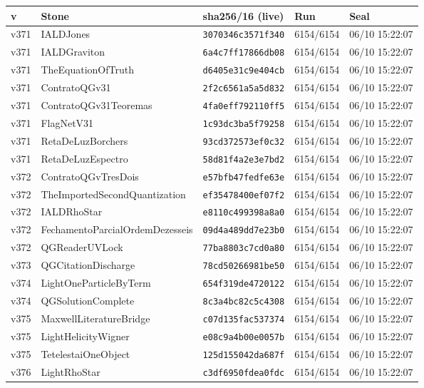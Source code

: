 \documentclass[11pt]{article}
\theoremstyle{definition}\newtheorem{deriv}{Derivation}
\begin{document}
{\small\begin{longtable}{@{}lllll@{}}\toprule v & Stone & sha256/16 (live) & Run & Seal \\ \midrule\endhead 
v371 & IALDJones & \texttt{3070346c3571f340} & 6154/6154 & 06/10 15:22:07 \\
v371 & IALDGraviton & \texttt{6a4c7ff17866db08} & 6154/6154 & 06/10 15:22:07 \\
v371 & TheEquationOfTruth & \texttt{d6405e31c9e404cb} & 6154/6154 & 06/10 15:22:07 \\
v371 & ContratoQGv31 & \texttt{2f2c6561a5a5d832} & 6154/6154 & 06/10 15:22:07 \\
v371 & ContratoQGv31Teoremas & \texttt{4fa0eff792110ff5} & 6154/6154 & 06/10 15:22:07 \\
v371 & FlagNetV31 & \texttt{1c93dc3ba5f79258} & 6154/6154 & 06/10 15:22:07 \\
v371 & RetaDeLuzBorchers & \texttt{93cd372573ef0c32} & 6154/6154 & 06/10 15:22:07 \\
v371 & RetaDeLuzEspectro & \texttt{58d81f4a2e3e7bd2} & 6154/6154 & 06/10 15:22:07 \\
v372 & ContratoQGvTresDois & \texttt{e57bfb47fedfe63e} & 6154/6154 & 06/10 15:22:07 \\
v372 & TheImportedSecondQuantization & \texttt{ef35478400ef07f2} & 6154/6154 & 06/10 15:22:07 \\
v372 & IALDRhoStar & \texttt{e8110c499398a8a0} & 6154/6154 & 06/10 15:22:07 \\
v372 & FechamentoParcialOrdemDezesseis & \texttt{09d4a489dd7e23b0} & 6154/6154 & 06/10 15:22:07 \\
v372 & QGReaderUVLock & \texttt{77ba8803c7cd0a80} & 6154/6154 & 06/10 15:22:07 \\
v373 & QGCitationDischarge & \texttt{78cd50266981be50} & 6154/6154 & 06/10 15:22:07 \\
v374 & LightOneParticleByTerm & \texttt{654f319de4720122} & 6154/6154 & 06/10 15:22:07 \\
v374 & QGSolutionComplete & \texttt{8c3a4bc82c5c4308} & 6154/6154 & 06/10 15:22:07 \\
v375 & MaxwellLiteratureBridge & \texttt{c07d135fac537374} & 6154/6154 & 06/10 15:22:07 \\
v375 & LightHelicityWigner & \texttt{e08c9a4b00e0057b} & 6154/6154 & 06/10 15:22:07 \\
v375 & TetelestaiOneObject & \texttt{125d155042da687f} & 6154/6154 & 06/10 15:22:07 \\
v376 & LightRhoStar & \texttt{c3df6950fdea0fdc} & 6154/6154 & 06/10 15:22:07 \\

\end{longtable}}
\end{document}
